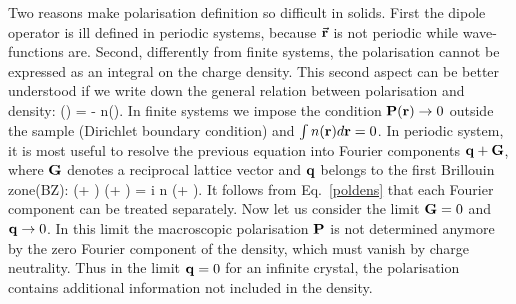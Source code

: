 Two reasons make polarisation definition so difficult in solids. First the dipole operator is ill defined in periodic systems, because $\vec {{\bf r}}$ is not periodic while wave-functions are. Second, differently from finite systems, the polarisation cannot be expressed as an integral on the charge density\cite{Martin1998}.
This second aspect can be better understood if we write down the general relation between polarisation and density:
\be
\nabla \cdot \PP(\rr) = - n(\rr).
\ee                              
In finite systems we impose the condition  ${\bf P}({\bf r}) \rightarrow 0 $ outside the sample (Dirichlet boundary condition) and $\int n({\bf r}) d{\bf r}=0$.
In periodic system, it is most useful to resolve the previous equation into Fourier components ${\bf q}+ {\bf G}$,
where ${\bf G}$ denotes a reciprocal lattice vector and ${\bf q}$ belongs to the first Brillouin zone(BZ):
\be
(\qq + \GG) \cdot \PP(\qq + \GG) = i n (\qq + \GG).
\label{poldens}
\ee
It follows from Eq.~\ref{poldens} that each Fourier component can be treated separately. Now let us consider the limit ${\bf G}=0$ and ${\bf q} \rightarrow 0$. In this limit  the macroscopic polarisation ${\bf P}$ is not determined anymore by the zero Fourier component of the density, which must vanish by charge neutrality.  Thus in the limit ${\bf q} = 0$ for an infinite crystal, the polarisation contains additional information not included in the density.\cite{Martin1998} \\
